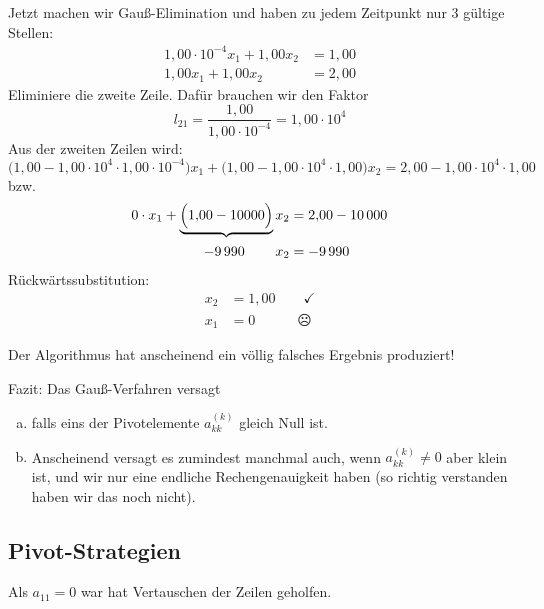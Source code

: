 \begin{bsp}
Jetzt machen wir Gauß-Elimination und haben zu jedem Zeitpunkt nur 3 gültige Stellen:
\begin{align*}
1{,}00 \cdot 10^{-4} x_1 + 1{,}00x_2 & = 1{,}00 \\
1{,}00 x_1 + 1{,}00x_2 & = 2{,}00
\end{align*}
Eliminiere die zweite Zeile.  Dafür brauchen wir den Faktor
\begin{equation*}
l_{21} = \frac{1{,}00}{1{,}00 \cdot 10^{-4}} = 1{,}00 \cdot 10^4
\end{equation*}
Aus der zweiten Zeilen wird:
\begin{equation*}
\big(1{,}00 - 1{,}00\cdot 10^4 \cdot 1{,}00 \cdot 10^{-4}\big)x_1
    + \big( 1{,}00 - 1{,}00 \cdot 10^4 \cdot 1{,}00 \big) x_2
 =
 2{,}00 - 1{,}00\cdot 10^4 \cdot 1{,}00
\end{equation*}
bzw.
\begin{align*}
0 \cdot x_1 + \underbrace{\Big( 1{,}00 - 10000\Big)}x_2 & = 2{,}00 - 10\,000
\\ -9\,990 \hspace{2.2em}x_2 &= - 9\,990
\end{align*}
Rückwärtssubstitution:
\begin{align*}
 x_2 & = 1{,}00 \qquad \checkmark \\
 x_1 & = 0 \hspace{1em} \qquad  \frownie
\end{align*}
\end{bsp}

Der Algorithmus hat anscheinend ein völlig falsches Ergebnis produziert!

\bigskip

Fazit: Das Gauß-Verfahren versagt
\begin{enumerate}[a)]
 \item falls eins der Pivotelemente $a_{kk}^{(k)}$ gleich Null ist.
 \item Anscheinend versagt es zumindest manchmal auch, wenn $a_{kk}^{(k)} \neq 0$ aber klein ist,
 und wir nur eine endliche Rechengenauigkeit haben (so richtig verstanden haben wir das noch nicht).
\end{enumerate}

\subsection{Pivot-Strategien}

Als $a_{11} = 0$ war hat Vertauschen der Zeilen geholfen.

\medskip

